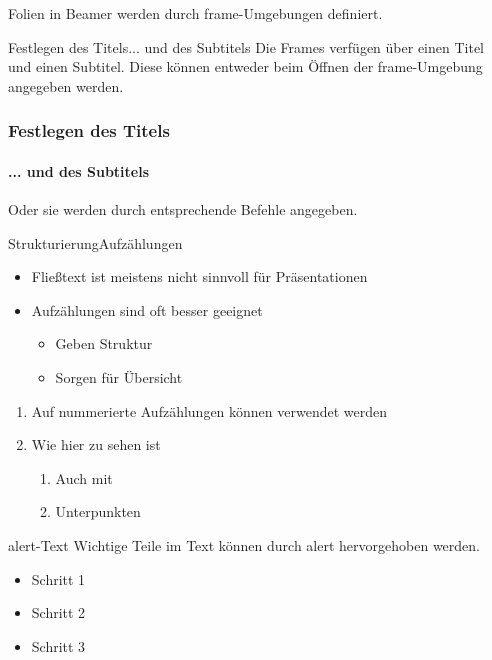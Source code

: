 \documentclass[t,aspectratio=169,dvipsnames]{beamer}
\begin{document}
\begin{frame}
Folien in Beamer werden durch frame-Umgebungen definiert.
\end{frame}

\begin{frame}{Festlegen des Titels}{... und des Subtitels}
Die Frames verfügen über einen Titel und einen Subtitel.
Diese können entweder beim Öffnen der frame-Umgebung angegeben werden.
\end{frame}

\begin{frame}
	\frametitle{Festlegen des Titels}
	\framesubtitle{... und des Subtitels}
	Oder sie werden durch entsprechende Befehle angegeben.
\end{frame}

\begin{frame}{Strukturierung}{Aufzählungen}
\begin{itemize}
	\item Fließtext ist meistens nicht sinnvoll für Präsentationen
	\item Aufzählungen sind oft besser geeignet
	\begin{itemize}
		\item Geben Struktur
		\item Sorgen für Übersicht
	\end{itemize}
\end{itemize}
\begin{enumerate}
	\item Auf nummerierte Aufzählungen können verwendet werden
	\item Wie hier zu sehen ist
	\begin{enumerate}
		\item Auch mit
		\item Unterpunkten
	\end{enumerate} 
\end{enumerate}
\end{frame}

\begin{frame}{alert-Text}
	Wichtige Teile im Text können \alert<2>{durch alert hervorgehoben} werden.
	\begin{itemize}[<+-|alert@+>]
		\item Schritt 1
		\item Schritt 2
		\item Schritt 3
	\end{itemize}
\end{frame}
\end{document}
